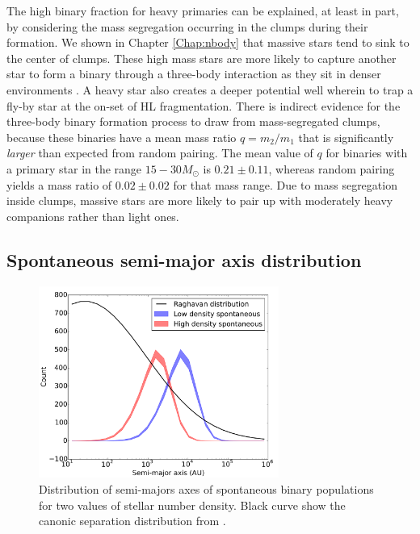 The high binary fraction for heavy primaries can be explained, at least in part,  by considering the mass segregation occurring in the clumps during their formation. We shown in Chapter \ref{Chap:nbody} that massive stars tend to sink to the center of clumps. These high mass stars are more likely to capture another star to form a binary through a three-body interaction as they sit in denser environments \citep{Spitzer1987}. A heavy star also creates a deeper potential well wherein to trap a fly-by star at the on-set of HL fragmentation. There is indirect evidence for the three-body binary formation process to draw from mass-segregated clumps, because these binaries have a mean mass ratio $q = m_2/m_1$  that is significantly \textit{larger} than expected from random pairing. The mean value of $q$ for  binaries with a primary star in the range $15-30 M_\odot$  is $0.21 \pm 0.11$, whereas random pairing  yields a mass ratio of $0.02 \pm 0.02$ for that mass range. Due to mass segregation inside clumps, massive stars are more likely to pair up with moderately heavy companions rather than light ones.



\subsection{Spontaneous semi-major axis distribution}
\label{Sub:spontaneous_separations}



\begin{figure}
\begin{center}
\includegraphics[width=0.7\textwidth]{Figures/5_spontaneous_smaxis}
\caption[Spontaneous binary population: semi-major axis distribution]{Distribution of semi-majors axes of spontaneous binary populations for two values of stellar number density. Black curve show the canonic separation distribution from \protect\cite{Raghavan2010}. }
\label{Fig:5_spontaneous_smaxis}
\end{center}
\end{figure}

